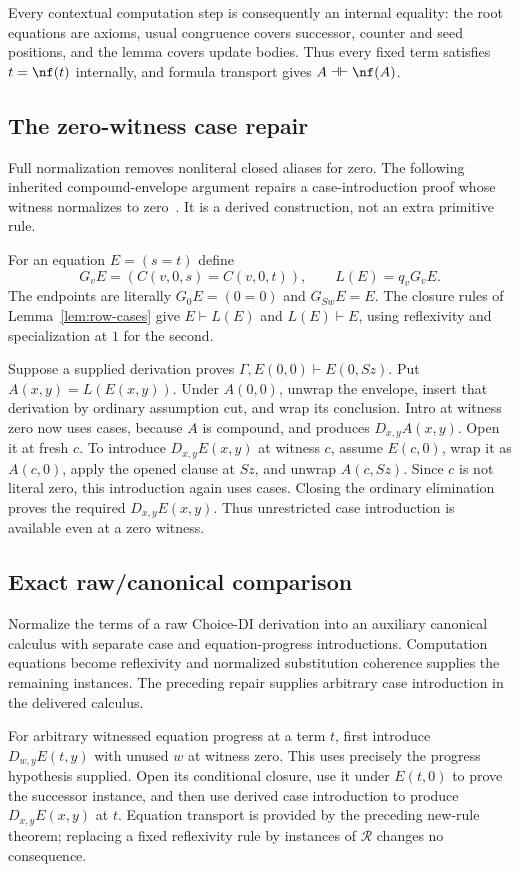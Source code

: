 Every contextual computation step is consequently an internal equality:
the root equations are axioms, usual congruence covers successor, counter and
seed positions, and the lemma covers update bodies. Thus every fixed term
satisfies $t=\nf(t)$ internally, and formula transport gives
$A\dashv\vdash\nf(A)$.

\subsection{The zero-witness case repair}
\label{sec:zero-repair}

Full normalization removes nonliteral closed aliases for zero. The following
inherited compound-envelope argument repairs a case-introduction proof whose
witness normalizes to zero~\cite{normalization,prior}. It is a derived
construction, not an extra primitive rule.

For an equation $E=(s=t)$ define
\[
 G_vE=(C(v,0,s)=C(v,0,t)),\qquad L(E)=q_vG_vE.
\]
The endpoints are literally $G_0E=(0=0)$ and $G_{Sw}E=E$.
The closure rules of Lemma~\ref{lem:row-cases} give $E\vdash L(E)$ and
$L(E)\vdash E$, using reflexivity and specialization at $1$ for the second.

Suppose a supplied derivation proves
$\Gamma,E(0,0)\vdash E(0,Sz)$. Put $A(x,y)=L(E(x,y))$.
Under $A(0,0)$, unwrap the envelope, insert that derivation by ordinary
assumption cut, and wrap its conclusion. Intro at witness zero now uses
cases, because $A$ is compound, and produces $D_{x,y}A(x,y)$.
Open it at fresh $c$. To introduce $D_{x,y}E(x,y)$ at witness $c$, assume
$E(c,0)$, wrap it as $A(c,0)$, apply the opened clause at $Sz$, and unwrap
$A(c,Sz)$. Since $c$ is not literal zero, this introduction again uses cases.
Closing the ordinary elimination proves the required $D_{x,y}E(x,y)$.
Thus unrestricted case introduction is available even at a zero witness.

\subsection{Exact raw/canonical comparison}

Normalize the terms of a raw Choice-DI derivation into an auxiliary canonical
calculus with separate case and equation-progress introductions. Computation
equations become reflexivity and normalized substitution coherence supplies
the remaining instances. The preceding repair supplies arbitrary case
introduction in the delivered calculus.

For arbitrary witnessed equation progress at a term $t$, first introduce
$D_{w,y}E(t,y)$ with unused $w$ at witness zero. This uses precisely the
progress hypothesis supplied. Open its conditional closure, use it under
$E(t,0)$ to prove the successor instance, and then use derived case
introduction to produce $D_{x,y}E(x,y)$ at $t$. Equation transport is
provided by the preceding new-rule theorem; replacing a fixed reflexivity
rule by instances of $\mathcal R$ changes no consequence.

